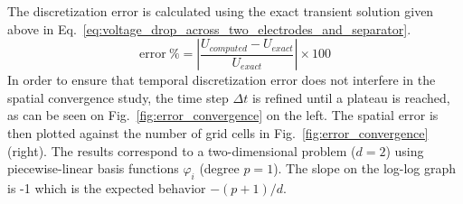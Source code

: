 The discretization error is calculated using the exact transient solution
given above in Eq.~\eqref{eq:voltage_drop_across_two_electrodes_and_separator}.
\begin{equation}
    \mathrm{error\ \%} =
    \left| \frac{U_{computed} - U_{exact}}{U_{exact}} \right| \times 100
\end{equation}
In order to ensure that temporal discretization error does not interfere in
the spatial convergence study, the time step $\Delta t$ is refined until a
plateau is reached, as can be seen on Fig.~\ref{fig:error_convergence} on the
left.  The spatial error is then plotted against the number of grid cells in
Fig.~\ref{fig:error_convergence} (right).  The results correspond to a
two-dimensional problem ($d=2$) using piecewise-linear basis functions
$\varphi_i$ (degree $p=1$).  The slope on the log-log graph is -1 which is the
expected behavior $-(p+1)/d$.
